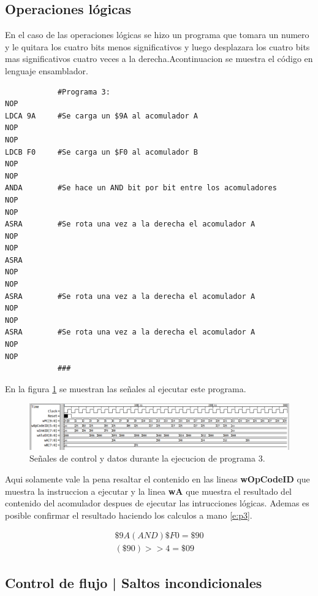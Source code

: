 \documentclass[paper=letter, fontsize=12pt]{article}
\begin{document}
\clearpage
\subsection{Operaciones lógicas}

En el caso de las operaciones lógicas se hizo un programa que tomara un numero y le quitara los cuatro bits menos significativos y luego desplazara los cuatro bits mas significativos cuatro veces a la derecha.Acontinuacion se muestra el código en lenguaje ensamblador.

\begin{lstlisting}
			#Programa 3:
NOP
LDCA 9A		#Se carga un $9A al acomulador A
NOP
NOP
LDCB F0		#Se carga un $F0 al acomulador B
NOP
NOP
ANDA		#Se hace un AND bit por bit entre los acomuladores
NOP
NOP
ASRA		#Se rota una vez a la derecha el acomulador A
NOP
NOP
ASRA
NOP
NOP
ASRA		#Se rota una vez a la derecha el acomulador A
NOP
NOP
ASRA		#Se rota una vez a la derecha el acomulador A
NOP
NOP
			###
\end{lstlisting}

En la figura \ref{i:p3} se muestran las señales al ejecutar este programa.\\

\begin{figure}[hbtp]
\centering
\includegraphics[width=1\linewidth]{../media/Prog3.png}
\caption{Señales de control y datos durante la ejecucion de programa 3.}
\label{i:p3}
\end{figure}

Aqui solamente vale la pena resaltar el contenido en las lineas \textbf{wOpCodeID} que muestra la instruccion a ejecutar y la linea \textbf{wA} que muestra el resultado del contenido del acomulador despues de ejecutar las intrucciones lógicas. Ademas es posible confirmar el resultado haciendo los calculos a mano \ref{e:p3}.

\begin{align} 
\label{e:p3}
\$9A  (AND) \$F0 = \$90 \\
(\$90) >> 4 = \$09
\end{align}


\subsection{Control de flujo | Saltos incondicionales}
\end{document}
